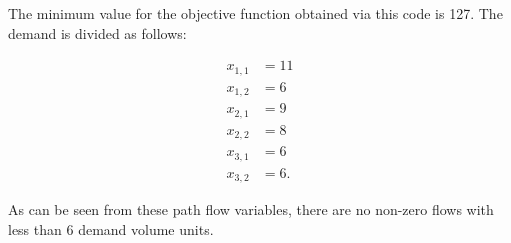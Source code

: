 

The minimum value for the objective function obtained via this code is 127. The
demand is divided as follows:

\begin{align*}
	x_{1,1} &= 11 \\
	x_{1,2} &= 6 \\
	x_{2,1} &= 9 \\
	x_{2,2} &= 8 \\
	x_{3,1} &= 6 \\
	x_{3,2} &= 6
.\end{align*}

As can be seen from these path flow variables, there are no non-zero flows with
less than 6 demand volume units.
